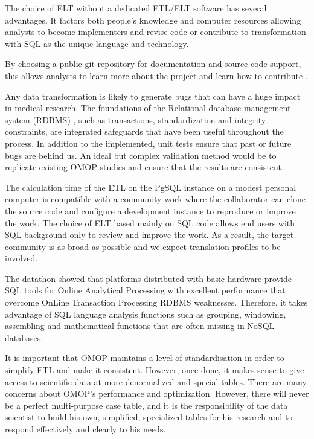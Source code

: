 The choice of ELT without a dedicated ETL/ELT software has several advantages.
It factors both people's knowledge and computer resources allowing 
analysts to become implementers and revise code or contribute to transformation 
with SQL as the unique language and technology.

By choosing a public git repository for documentation and source code support, 
this allows analysts to learn more about the project and learn how to 
contribute \cite{mimic-git}.


Any data transformation is likely to generate bugs that can have a huge impact 
in medical research. The foundations of the Relational database management system (RDBMS)
, such as transactions, standardization and integrity constraints, are integrated 
safeguards that have been useful throughout the process. In addition to the implemented, 
unit tests ensure that past or future bugs are behind us. An ideal but complex 
validation method \cite{johnson-reprod} would be to replicate existing OMOP 
studies and ensure that the results are consistent. 


The calculation time of the ETL on the PgSQL instance on a modest personal 
computer is compatible with a community work where the collaborator can clone 
the source code and configure a development instance to reproduce or improve 
the work. The choice of ELT based mainly on SQL code allows end users with 
SQL background only to review and improve the work. 
As a result, the target community is as broad as possible and we expect 
translation profiles to be involved.

The datathon showed that platforms distributed with basic hardware provide SQL 
tools for Online Analytical Processing  with excellent performance that overcome 
OnLine Transaction Processing RDBMS weaknesses. 
Therefore, it takes advantage of SQL language analysis functions 
such as grouping, windowing, assembling and mathematical functions that are 
often missing in NoSQL databases.

It is important that OMOP maintains a level of standardisation in order to 
simplify ETL and make it consistent. However, once done, it makes sense to give 
access to scientific data at more denormalized and special tables. 
There are many concerns about OMOP's performance and optimization. However, 
there will never be a perfect multi-purpose case table, and it is the 
responsibility of the data scientist to build his own, simplified, specialized 
tables for his research and to respond effectively and clearly to his needs.


